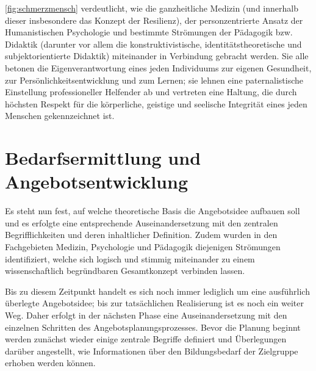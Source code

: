 \documentclass[
  twoside,
  parskip=half-,
  paper=176mm:246mm,
  BCOR=14mm,
  DIV=14,
]{scrreprt}
\begin{document}
\autoref{fig:schmerzmensch} verdeutlicht, wie die ganzheitliche Medizin (und innerhalb dieser insbesondere das Konzept der Resilienz), der personzentrierte Ansatz der Humanistischen Psychologie und bestimmte Strömungen der Pädagogik bzw. Didaktik (darunter vor allem die konstruktivistische, identitätstheoretische und subjektorientierte Didaktik) miteinander in Verbindung gebracht werden. Sie alle betonen die Eigenverantwortung eines jeden Individuums zur eigenen Gesundheit, zur Persönlichkeitsentwicklung und zum Lernen; sie lehnen eine paternalistische Einstellung professioneller Helfender ab und vertreten eine Haltung, die durch höchsten Respekt für die körperliche, geistige und seelische Integrität eines jeden Menschen gekennzeichnet ist. 

\chapter{Bedarfsermittlung und Angebotsentwicklung}

Es steht nun fest, auf welche theoretische Basis die Angebotsidee aufbauen soll und es erfolgte eine entsprechende Auseinandersetzung mit den zentralen Begrifflichkeiten und deren inhaltlicher Definition. Zudem wurden in den Fachgebieten Medizin, Psychologie und Pädagogik diejenigen Strömungen identifiziert, welche sich logisch und stimmig miteinander zu einem wissenschaftlich begründbaren Gesamtkonzept verbinden lassen.

Bis zu diesem Zeitpunkt handelt es sich noch immer lediglich um eine ausführlich überlegte Angebotsidee; bis zur tatsächlichen Realisierung ist es noch ein weiter Weg. Daher erfolgt in der nächsten Phase eine Auseinandersetzung mit den einzelnen Schritten des Angebotsplanungsprozesses. Bevor die Planung beginnt werden zunächst wieder einige zentrale Begriffe definiert und Überlegungen darüber angestellt, wie Informationen über den Bildungsbedarf der Zielgruppe erhoben werden können.
\end{document}
